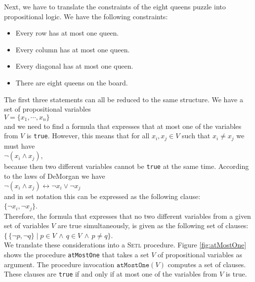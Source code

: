 Next, we have to translate the constraints of the eight queens puzzle
into propositional logic.
We have the following constraints:
\begin{itemize}
\item Every row has at most one queen.
\item Every column has at most one queen.
\item Every diagonal has at most one queen.
\item There are eight queens on the board.
\end{itemize}
The first three statements can all be reduced to the same structure.  
We have a set of propositional variables \\[0.2cm]
\hspace*{1.3cm} $V = \{ x_1, \cdots, x_n \}$ \\[0.2cm]
and we need to find a formula that expresses that at most one of the variables from $V$ is
\texttt{true}.  However, this means that for all
$x_i, x_j \in V$ such that $x_i \not= x_j$ we must have \\[0.2cm]
\hspace*{1.3cm} $\neg (x_i \wedge x_j)$, \\[0.2cm]
because then two different variables cannot be \texttt{true} at the same time.
According to the laws of DeMorgan we have
\\[0.2cm]
\hspace*{1.3cm}
$\neg (x_i \wedge x_j) \leftrightarrow \neg x_i \vee \neg x_j$
\\[0.2cm]
and in set notation this can be expressed as the following clause:
\\[0.2cm]
\hspace*{1.3cm}  $\{\neg x_i, \neg x_j \}$. \\[0.2cm]
Therefore, the formula that expresses that no two different variables from a given set of variables
$V$ are true simultaneously, is given as the following set of clauses:
\\[0.2cm]
\hspace*{1.3cm} $\bigl\{\, \{ \neg p, \neg q \} \;|\; p \in V \,\wedge\, q \in V
\,\wedge\, p \not= q \bigr\}$.
\\[0.2cm]
We translate these considerations into a \textsc{Setl} procedure.  Figure \ref{fig:atMostOne}
shows the procedure \texttt{atMostOne} that
takes a set $V$ of propositional variables as argument.  The
procedure invocation  $\texttt{atMostOne}(V)$ computes a set of clauses.  These clauses are
\texttt{true} if and only if at most one of the variables from $V$ is true.


